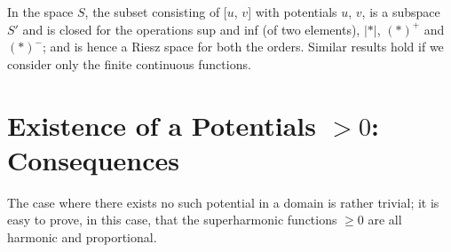 In the space $S$, the subset consisting of [$u$, $v$] with potentials
$u$, $v$, is a subspace $S'$ and is closed for the operations sup and
inf (of two elements), $|*|$, $(*)^+ $ and $(*)^-$; and is hence a
Riesz space for both the orders. Similar results hold if we consider
only the finite continuous functions.	 

\section{Existence of a Potentials \texorpdfstring{$> 0$}{0}: Consequences}\label{p4:chap4:sec21}  %

The case where there exists no such potential in a domain is rather
trivial; it is easy to prove, in this case, that the superharmonic
functions $\ge 0$ are all harmonic and proportional. 

